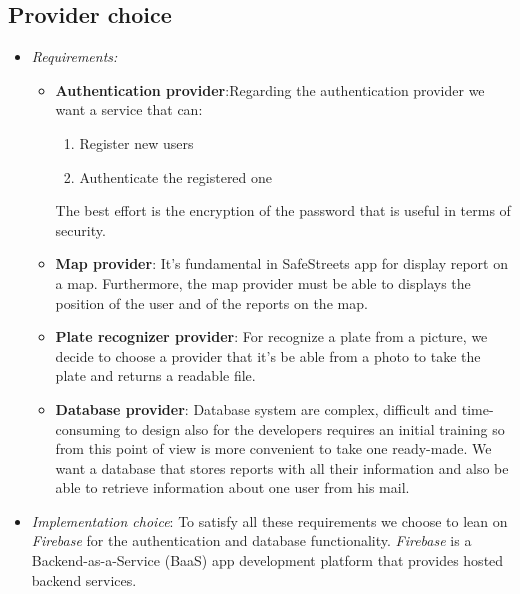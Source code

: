 \documentclass[../RASD.tex]{subfiles}
\begin{document}
    \subsection{Provider choice}\label{sec:provider-choice}
    \begin{itemize}
        \item \textit{Requirements:} \begin{itemize}
                                         \item \textbf{Authentication provider}:\newline Regarding the authentication provider we want a service that can:
                                         \begin{enumerate}
                                             \item Register new users
                                             \item Authenticate the registered one
                                         \end{enumerate}
                                         The best effort is the encryption of the password that is useful in terms of security.
                                         \item \textbf{Map provider}: \newline It’s fundamental in SafeStreets app for display report on a map. Furthermore, the map provider must be able to displays the position of the user and of the reports on the map.
                                         \item \textbf{Plate recognizer provider}: \newline For recognize a plate from a picture, we decide to choose a provider that it’s be able from a photo to take the plate and returns a readable file.
                                         \item \textbf{Database provider}: \newline Database system are complex, difficult and time-consuming to design also for the developers requires an initial training so from this point of view is more convenient to take one ready-made.
                                         We want a database that stores reports with all their information and also be able to retrieve information about one user from his mail.
        \end{itemize}
        \item \textit{Implementation choice}: \newline To satisfy all these requirements we choose to lean on \textit{Firebase} for the authentication and database functionality. \textit{Firebase} is a Backend-as-a-Service (BaaS) app development platform that provides hosted backend services.


\end{itemize}
\end{document}
